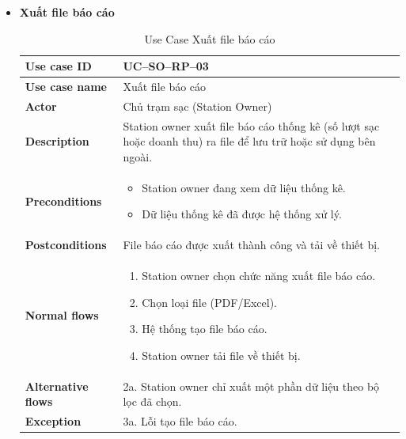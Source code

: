 \begin{enumerate}[label=\textbf{\alph*)}]
\begin{itemize}
  \item \textbf{Xuất file báo cáo}
    \begin{center}
      \renewcommand{\arraystretch}{1.5}
      \begin{longtable}{|m{}|m{}|}
          \caption{Use Case Xuất file báo cáo}
        \label{tab:uc_so_rp_03} \\
        \hline
        \textbf{Use case ID} & UC--SO--RP--03 \\
        \hline
        \textbf{Use case name} & Xuất file báo cáo \\
        \hline
        \textbf{Actor} & Chủ trạm sạc (Station Owner) \\
        \hline
        \textbf{Description} &
        Station owner xuất file báo cáo thống kê (số lượt sạc hoặc doanh thu) ra file để lưu trữ hoặc sử dụng bên ngoài. \\
        \hline
        \textbf{Preconditions} &
        \begin{itemize}
          \item Station owner đang xem dữ liệu thống kê.
          \item Dữ liệu thống kê đã được hệ thống xử lý.
        \end{itemize}\\
        \hline
        \textbf{Postconditions} &
        File báo cáo được xuất thành công và tải về thiết bị.\\
        \hline
        \textbf{Normal flows} &
        \begin{enumerate}[label=\arabic*.]
          \item Station owner chọn chức năng xuất file báo cáo.
          \item Chọn loại file (PDF/Excel).
          \item Hệ thống tạo file báo cáo.
          \item Station owner tải file về thiết bị.
        \end{enumerate}\\
        \hline
        \textbf{Alternative flows} &
        2a. Station owner chỉ xuất một phần dữ liệu theo bộ lọc đã chọn.\\
        \hline
        \textbf{Exception} &
        3a. Lỗi tạo file báo cáo.\\
        \hline
        \end{longtable}
    \end{center}
\end{itemize}


\end{enumerate}
